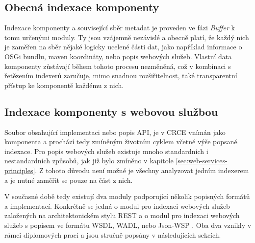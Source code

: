 \documentclass[czech,DP]{thesiskiv}
\begin{document}
\subsection{Obecná indexace komponenty}

Indexace komponenty a související sběr metadat je proveden ve fázi \textit{Buffer} k tomu určenými moduly. Ty jsou vzájemně nezávislé a obecně platí, že každý nich je zaměřen na sběr nějaké logicky ucelené části dat, jako například informace o OSGi bundlu, maven koordináty, nebo popis webových služeb. Vlastní data komponenty zůstávají během tohoto procesu nezměněná, což v kombinaci s řetězením indexerů zaručuje, mimo snadnou rozšiřitelnost, také transparentní přístup ke komponentě každému z nich. 

\subsection{Indexace komponenty s webovou službou}

Soubor obsahující implementaci nebo popis API, je v CRCE vnímán jako komponenta a prochází tedy zmíněným životním cyklem včetně výše popsané indexace. Pro popis webových služeb existuje mnoho standardních i nestandardních způsobů, jak již bylo zmíněno v kapitole \ref{sec:web-services-principles}. Z tohoto důvodu není možné je všechny analyzovat jedním indexerem a je nutné zaměřit se pouze na část z nich. 

V současné době tedy existují dva moduly podporující několik popisných formátů a implementací. Konkrétně se jedná o modul pro indexaci webových služeb založených na architektonickém stylu REST \cite{hessova2015rest} a o modul pro indexaci webových služeb s popisem ve formátu WSDL, WADL, nebo Json-WSP \cite{pejrimovsky2015ws}. Oba dva vznikly v rámci diplomových prací a jsou stručně popsány v následujících sekcích.

\end{document}
